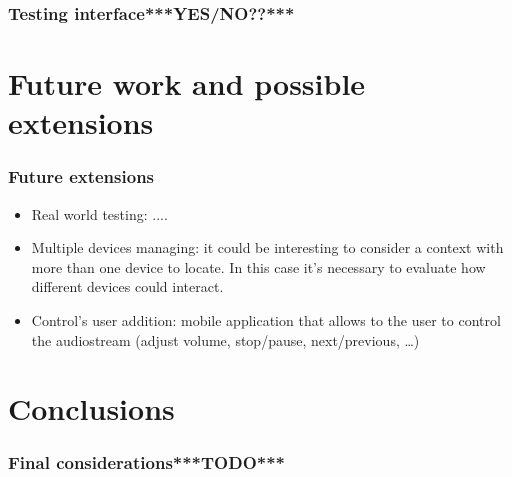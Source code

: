 \documentclass{beamer}
\begin{document}
	\begin{frame}
		\frametitle{Testing interface***YES/NO??***}
	\end{frame}
	

\section{Future work and possible extensions}

	
	\begin{frame}
		\frametitle{Future extensions}
		\begin{itemize}
		\item Real world testing: ....
		\pause
		\item Multiple devices managing: it could be interesting to consider a context with more than one device to locate. In this case it's necessary to evaluate how different devices could interact.
		\pause
		\item Control's user addition: mobile application that allows to the user to control the audiostream (adjust volume, stop/pause, next/previous, \ldots)
		\end{itemize}
	\end{frame}
	

\section{Conclusions}
	\begin{frame}
		\frametitle{Final considerations***TODO***}
	\end{frame}
\end{document}
